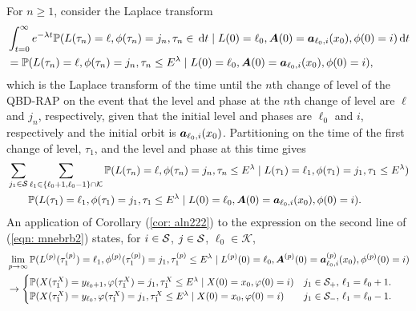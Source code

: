 For \(n\geq 1\), consider the Laplace transform 
\begin{align}
	&\int_{t=0}^\infty e^{-\lambda t} \mathbb P(L(\tau_n) = \ell, \phi(\tau_n) = j_n, \tau_{n}\in \, \mathrm{d} t
	 \mid L(0)=\ell_0, \boldsymbol A(0)=\boldsymbol  a_{\ell_0,i}(x_0), \phi(0)=i) \, \mathrm{d} t \nonumber 
	 \\&=\mathbb P(L(\tau_n) = \ell, \phi(\tau_n) = j_n, \tau_{n}\leq E^{\lambda}
	 \mid L(0)=\ell_0, \boldsymbol A(0)=\boldsymbol  a_{\ell_0,i}(x_0), \phi(0)=i),\nonumber 
\end{align}
which is the Laplace transform of the time until the \(n\)th change of level of the QBD-RAP on the event that the level and phase at the \(n\)th change of level are \(\ell\) and \(j_n\), respectively, given that the initial level and phases are \(\ell_0\) and \(i\), respectively and the initial orbit is \(\boldsymbol a_{\ell_0,i}(x_0)\). Partitioning on the time of the first change of level, \(\tau_1\), and the level and phase at this time gives
\begin{align}
	&\sum_{j_1\in\mathcal S}\sum_{\ell_1\in\{\ell_0+1,\ell_0-1\}\cap \mathcal K}\mathbb P(L(\tau_n) = \ell, \phi(\tau_n) = j_n, \tau_{n}\leq E^\lambda 
	 \mid L(\tau_1)=\ell_1, 
	 \phi(\tau_1)=j_1, \tau_1\leq E^\lambda ) \nonumber
	 \\&\qquad \mathbb P(L(\tau_1)=\ell_1, \phi(\tau_1) = j_1, \tau_{1}\leq E^\lambda
	 \mid L(0)=\ell_0, \boldsymbol A(0)=\boldsymbol  a_{\ell_0,i}(x_0), \phi(0)=i).\label{eqn: mnebrb2}
\end{align}
An application of Corollary (\ref{cor: aln222}) to the expression on the second line of (\ref{eqn: mnebrb2}) states, for \(i\in\mathcal{S}\), \(j\in\mathcal{S}\), \(\ell_0\in\mathcal K\), 
\begin{align}
	&\lim_{p\to\infty}\mathbb P(L^{(p)}(\tau_1^{(p)})=\ell_1, \phi^{(p)}(\tau_1^{(p)}) = j_1, \tau_{1}^{(p)}\leq E^\lambda
	 \mid L^{(p)}(0)=\ell_0, \boldsymbol A^{(p)}(0)=\boldsymbol  a_{\ell_0,i}^{(p)}(x_0), \phi^{(p)}(0)=i) \nonumber
	 \\&\to\begin{cases}
	 	\mathbb P(X(\tau_1^X) = y_{\ell_0+1}, \varphi(\tau_1^X) = j_1, \tau_{1}^X\leq E^\lambda 
            	 \mid X(0) = x_0, \varphi(0) = i) & j_1\in\mathcal{S}_+,\, \ell_1=\ell_0+1.
	 	\\\mathbb P(X(\tau_1^X) = y_{\ell_0}, \varphi(\tau_1^X) = j_1, \tau_{1}^X\leq E^\lambda 
            	 \mid X(0) = x_0, \varphi(0) = i) & j_1\in\mathcal{S}_-,\, \ell_1=\ell_0-1.
	 \end{cases}
\end{align}

